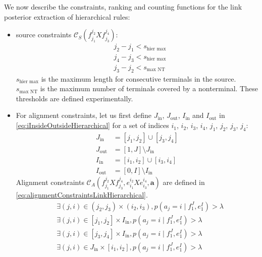 We now describe the constraints, ranking and counting functions for the link
posterior extraction of hierarchical rules:
%
\begin{itemize}
  \item source constraints $\mathcal{C}_S(f_{j_1}^{j_2} X f_{j_3}^{j_4})$:
%
\begin{equation}
  \begin{split}
    & j_2 - j_1 < s_{\text{hier max}} \\
    & j_4 - j_3 < s_{\text{hier max}} \\
    & j_3 - j_2 < s_{\text{max NT}}
  \end{split}
\end{equation}
%
$s_{\text{hier max}}$ is the maximum length for consecutive terminals
in the source. $s_{\text{max NT}}$ is the maximum number of
terminals covered by a nonterminal. These thresholds are defined
experimentally.
  \item For alignment constraints, let us first define $J_{\text{in}}$, $J_{\text{out}}$, $I_{\text{in}}$ and
$I_{\text{out}}$ in \autoref{eq:iInsideOutsideHierarchical}
for a set of indices
$i_1$, $i_2$, $i_3$, $i_4$, $j_1$, $j_2$, $j_3$, $j_4$:
%
\begin{equation}
\begin{split}
  J_{\text{in}} &= [j_1, j_2] \cup [j_3, j_4] \\
  J_{\text{out}} &= [1, J] \setminus J_{\text{in}} \\
  I_{\text{in}} &= [i_1, i_2] \cup [i_3, i_4] \\
  I_{\text{out}} &= [0, I] \setminus I_{\text{in}}
\end{split}
\label{eq:iInsideOutsideHierarchical}
\end{equation}
%
Alignment constraints
$\mathcal{C}_A(f_{j_1}^{j_2} X f_{j_3}^{j_4}, e_{i_1}^{i_2} X e_{i_3}^{i_4}, \bm{a})$
are defined in \autoref{eq:alignmentConstraintsLinkHierarchical}.
%
\begin{equation}
  \begin{split}
    & \exists (j,i) \in (j_2, j_3) \times (i_2, i_3), p(a_j = i \mid f_1^J,e_1^I) > \lambda \\
    & \exists (j,i) \in [j_1, j_2] \times I_{\text{in}}, p(a_j = i \mid f_1^J, e_1^I) > \lambda \\
    & \exists (j,i) \in [j_3, j_4] \times I_{\text{in}}, p(a_j = i \mid f_1^J, e_1^I) > \lambda \\
    & \exists (j,i) \in J_{\text{in}} \times [i_1, i_2], p(a_j = i \mid f_1^J, e_1^I) > \lambda \\

\end{split}
\end{equation}
\end{itemize}
